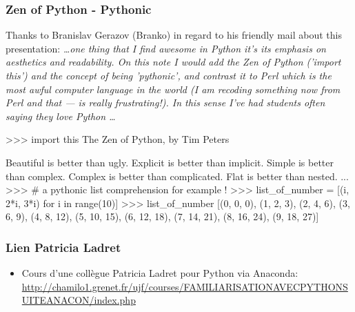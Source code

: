\begin{frame}[fragile]
\frametitle{Zen of Python - Pythonic}
\begin{scriptsize}
Thanks to Branislav Gerazov (Branko) in regard to his friendly mail about this presentation: \emph{\dots one thing that I find awesome in Python it's its emphasis on aesthetics and readability. On this note I would add the Zen of Python ('import this') and the concept of being 'pythonic', and contrast it to Perl which is the most awful computer language in the world (I am recoding something now from Perl and that --- is really frustrating!). In this sense I've had students often saying they love Python \dots} 
\end{scriptsize}

\begin{pythonConsole}
>>> import this
The Zen of Python, by Tim Peters

Beautiful is better than ugly.
Explicit is better than implicit.
Simple is better than complex.
Complex is better than complicated.
Flat is better than nested.
...
>>> # a pythonic list comprehension for example !
>>> list_of_number = [(i, 2*i, 3*i) for i in range(10)]  
>>> list_of_number 
[(0, 0, 0), (1, 2, 3), (2, 4, 6), (3, 6, 9), (4, 8, 12), (5, 10, 15), 
(6, 12, 18), (7, 14, 21), (8, 16, 24), (9, 18, 27)]
\end{pythonConsole}
\end{frame}
\begin{frame}
\frametitle{Lien Patricia Ladret}
\begin{itemize}
 \item Cours d'une collègue Patricia Ladret pour Python via Anaconda: 
 \url{http://chamilo1.grenet.fr/ujf/courses/FAMILIARISATIONAVECPYTHONSUITEANACON/index.php}
\end{itemize}
\end{frame}
